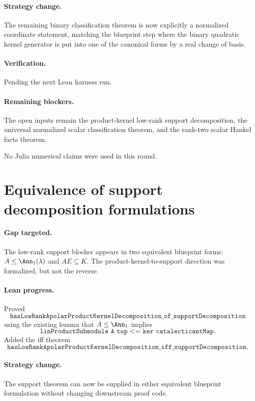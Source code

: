 \documentclass[11pt]{article}
\begin{document}
\paragraph{Strategy change.}
The remaining binary classification theorem is now explicitly a normalized
coordinate statement, matching the blueprint step where the binary quadratic
kernel generator is put into one of the canonical forms by a real change of
basis.

\paragraph{Verification.}
Pending the next Lean harness run.

\paragraph{Remaining blockers.}
The open inputs remain the product-kernel low-rank support decomposition, the
universal normalized scalar classification theorem, and the rank-two scalar
Hankel facts theorem.

No Julia numerical claims were used in this round.

\section*{Equivalence of support decomposition formulations}

\paragraph{Gap targeted.}
The low-rank support blocker appears in two equivalent blueprint forms:
\(A\le\Ann_1(\lambda)\) and \(AE\subseteq K\).  The product-kernel-to-support
direction was formalized, but not the reverse.

\paragraph{Lean progress.}
Proved
\[
\texttt{hasLowRankApolarProductKernelDecomposition\_of\_supportDecomposition}
\]
using the existing lemma that \(A\le\Ann_1\) implies
\[
\texttt{linProductSubmodule A top <= ker catalecticantMap}.
\]
Added the iff theorem
\[
\texttt{hasLowRankApolarProductKernelDecomposition\_iff\_supportDecomposition}.
\]

\paragraph{Strategy change.}
The support theorem can now be supplied in either equivalent blueprint
formulation without changing downstream proof code.
\end{document}
